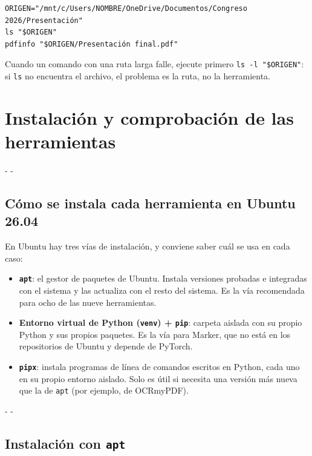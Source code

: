 \documentclass[11pt,a4paper]{article}
\makeatletter
\newcommand{\necesitaespacio}[1]{\par\penalty-100\begingroup
	\setlength{\dimen@}{#1}\dimen@ii\pagegoal\advance\dimen@ii-\pagetotal
	\ifdim\dimen@>\dimen@ii\ifdim\dimen@ii>\z@\vfil\fi\penalty-\@M\fi\endgroup}
\newcommand{\cmd}[1]{\texttt{\textcolor{colcmd}{#1}}}      %
\makeatother
\begin{document}
	\begin{lstlisting}
ORIGEN="/mnt/c/Users/NOMBRE/OneDrive/Documentos/Congreso 2026/Presentación"
ls "$ORIGEN"
pdfinfo "$ORIGEN/Presentación final.pdf"
\end{lstlisting}
	
	\begin{consejo}
		Cuando un comando con una ruta larga falle, ejecute primero \cmd{ls -l "\$ORIGEN"}: si \cmd{ls} no encuentra el archivo, el problema es la ruta, no la herramienta.
	\end{consejo}
	\clearpage
	\section{Instalación y comprobación de las herramientas}\label{sec:instalacion}
	
	\necesitaespacio{8\baselineskip}
	\subsection{Cómo se instala cada herramienta en Ubuntu 26.04}
	
	En Ubuntu hay tres vías de instalación, y conviene saber cuál se usa en cada caso:
	
	\begin{itemize}
		\item \textbf{\cmd{apt}}: el gestor de paquetes de Ubuntu. Instala versiones probadas e integradas con el sistema y las actualiza con el resto del sistema. Es la vía recomendada para ocho de las nueve herramientas.
		\item \textbf{Entorno virtual de Python (\cmd{venv}) + \cmd{pip}}: carpeta aislada con su propio Python y sus propios paquetes. Es la vía para Marker, que no está en los repositorios de Ubuntu y depende de PyTorch.
		\item \textbf{\cmd{pipx}}: instala programas de línea de comandos escritos en Python, cada uno en su propio entorno aislado. Solo es útil si necesita una versión más nueva que la de \cmd{apt} (por ejemplo, de OCRmyPDF).
	\end{itemize}
	
	\necesitaespacio{8\baselineskip}
	\subsection{Instalación con \texttt{apt}}
	
\end{document}
